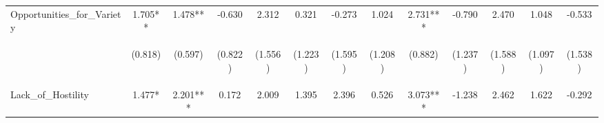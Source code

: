 \begin{tabular}{lcccccccccccc}
\noalign{\smallskip}Opportunities\_for\_Variety & 1.705** & 1.478** & -0.630 & 2.312 & 0.321 & -0.273 & 1.024 & 2.731*** & -0.790 & 2.470 & 1.048 & -0.533\\
 & \begin{footnotesize}(0.818)\end{footnotesize} & \begin{footnotesize}(0.597)\end{footnotesize} & \begin{footnotesize}(0.822)\end{footnotesize} & \begin{footnotesize}(1.556)\end{footnotesize} & \begin{footnotesize}(1.223)\end{footnotesize} & \begin{footnotesize}(1.595)\end{footnotesize} & \begin{footnotesize}(1.208)\end{footnotesize} & \begin{footnotesize}(0.882)\end{footnotesize} & \begin{footnotesize}(1.237)\end{footnotesize} & \begin{footnotesize}(1.588)\end{footnotesize} & \begin{footnotesize}(1.097)\end{footnotesize} & \begin{footnotesize}(1.538)\end{footnotesize}\\
\noalign{\smallskip}Lack\_of\_Hostility & 1.477* & 2.201*** & 0.172 & 2.009 & 1.395 & 2.396 & 0.526 & 3.073*** & -1.238 & 2.462 & 1.622 & -0.292\\

\end{tabular}
